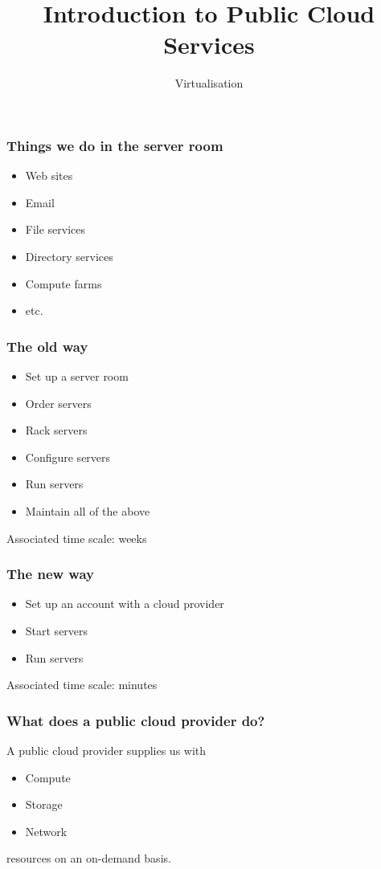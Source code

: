 \documentclass[10pt]{beamer}
\title{Introduction to Public Cloud Services}
\author[I720]{Virtualisation}
\institute[Otago Polytechnic]{
  Otago Polytechnic \\
  Dunedin, New Zealand \\
}
\date{}
\begin{document}
\begin{frame}[plain]
  \titlepage
\end{frame}

\begin{frame}
  \frametitle{Things we do in the server room}
  
  \begin{itemize}
    \item Web sites
    \item Email
    \item File services
    \item Directory services
    \item Compute farms
    \item etc.
  \end{itemize}
\end{frame}

\begin{frame}
  \frametitle{The old way}
  
  \begin{itemize}
    \item Set up a server room
    \item Order servers
    \item Rack servers
    \item Configure servers
    \item Run servers
    \item Maintain all of the above 
  \end{itemize}
  
  Associated time scale: weeks
  

\end{frame}


\begin{frame}
  \frametitle{The new way}
  
  \begin{itemize}
    \item Set up an account with a cloud provider
    \item Start servers
    \item Run servers
  \end{itemize}
  
  Associated time scale: minutes

\end{frame}

\begin{frame}
  \frametitle{What does a public cloud provider do?}
  
  A public cloud provider supplies us with
  
  \begin{itemize}
    \item Compute
    \item Storage
    \item Network
  \end{itemize}
  
  resources on an on-demand basis.

\end{frame}
\end{document}

